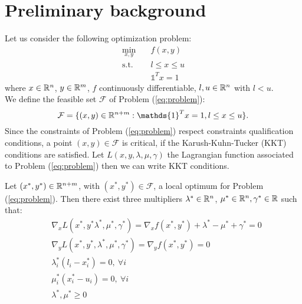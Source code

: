 \section{Preliminary background}
Let us consider the following optimization problem:
\begin{subequations}\label{eq:problem} 
\begin{align}
\min_{x,y} & \quad f(x,y)  \\
\text{s.t.} & \quad l \leq x \leq u \\
& \quad \mathds{1}^T x = 1 
\end{align}
\end{subequations}
where $x \in \mathbb{R}^n$, $y \in \mathbb{R}^m$, $f$ continuously differentiable, $l, u \in \mathbb{R}^n$ with $l < u$.\\
We define the feasible set $\mathcal{F}$  of Problem (\ref{eq:problem}):
\begin{equation}
\mathcal{F} = \{(x,y) \in \R^{n+m} : \mathds{1}^T x = 1, l \leq x \leq u\}.
\end{equation}
Since the constraints of Problem (\ref{eq:problem}) respect constraints qualification conditions, a point $(x,y) \in \mathcal{F}$ is critical, if the Karush-Kuhn-Tucker (KKT) conditions are satisfied. Let $L(x,y,\lambda,\mu,\gamma)$ the Lagrangian function associated to Problem (\ref{eq:problem}) then we can write KKT conditions.

\begin{proposition}\label{prop:KKT}

Let $(x^*,y^*) \in \mathbb{R}^{n+m}$, with $(x^*,y^*) \in \mathcal{F}$, a local optimum for Problem (\ref{eq:problem}). Then there exist three multipliers $\lambda^* \in \mathbb{R}^n$, $\mu^* \in \mathbb{R}^n, \gamma^* \in \mathbb{R}$ such that:
\begin{equation}
 \begin{aligned}
  &\nabla_x L(x^*,y^*\lambda^*,\mu^*,\gamma^*)= \nabla_x f(x^*,y^*)+\lambda^*-\mu^*+\gamma^*=0\\
 &\nabla_y L(x^*,y^*,\lambda^*,\mu^*,\gamma^*)=\nabla_y f(x^*,y^*) =0 \\
    &\lambda^*_i(l_i-x_i^*)=0,\ \forall i\\
 &\mu^*_i(x_i^*-u_i)=0,\ \forall i\\
   & \lambda^*,\mu^*\ge0 \\
 \end{aligned}
\end{equation}
\end{proposition}

